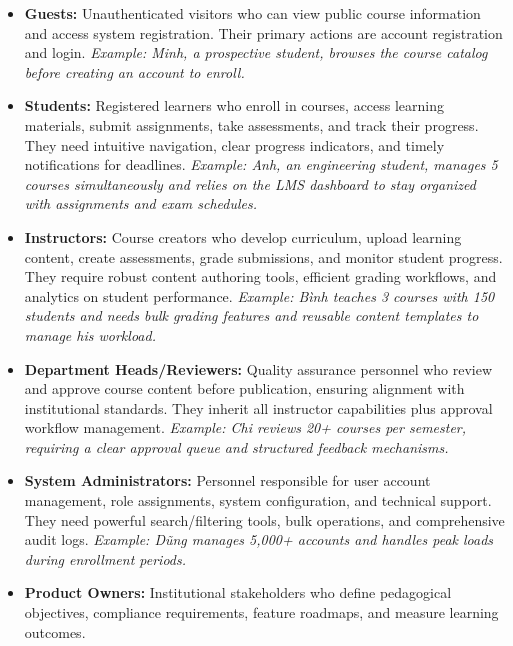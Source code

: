 \begin{itemize}
    \item \textbf{Guests:} Unauthenticated visitors who can view public course 
    information and access system registration. Their primary actions are account 
    registration and login. \textit{Example: Minh, a prospective student, browses 
    the course catalog before creating an account to enroll.}
    
    \item \textbf{Students:} Registered learners who enroll in courses, 
    access learning materials, submit assignments, take assessments, and track their 
    progress. They need intuitive navigation, clear progress indicators, and timely 
    notifications for deadlines. \textit{Example: Anh, an engineering student, 
    manages 5 courses simultaneously and relies on the LMS dashboard to stay organized 
    with assignments and exam schedules.}
    
    \item \textbf{Instructors:} Course creators who develop curriculum, 
    upload learning content, create assessments, grade submissions, and monitor 
    student progress. They require robust content authoring tools, efficient grading 
    workflows, and analytics on student performance. \textit{Example: Bình teaches 
    3 courses with 150 students and needs bulk grading features and reusable content 
    templates to manage his workload.}
    
    \item \textbf{Department Heads/Reviewers:} Quality assurance 
    personnel who review and approve course content before publication, ensuring 
    alignment with institutional standards. They inherit all instructor capabilities 
    plus approval workflow management. \textit{Example: Chi reviews 20+ courses per 
    semester, requiring a clear approval queue and structured feedback mechanisms.}
    
    \item \textbf{System Administrators:} Personnel responsible for 
    user account management, role assignments, system configuration, and technical 
    support. They need powerful search/filtering tools, bulk operations, and comprehensive 
    audit logs. \textit{Example: Dũng manages 5,000+ accounts and handles peak loads 
    during enrollment periods.}
    
    \item \textbf{Product Owners:} Institutional stakeholders 
    who define pedagogical objectives, compliance requirements, feature roadmaps, and 
    measure learning outcomes.
\end{itemize}

